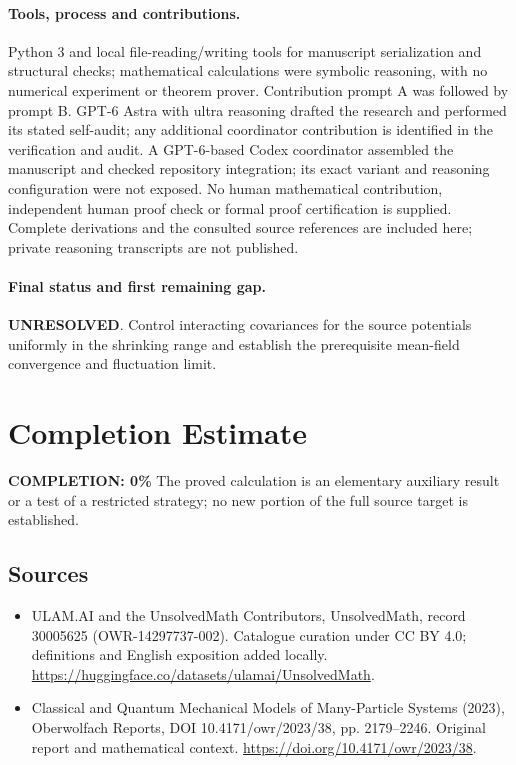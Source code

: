 \documentclass[11pt]{article}
\begin{document}
\paragraph{Tools, process and contributions.}
Python 3 and local file-reading/writing tools for manuscript serialization and structural checks; mathematical calculations were symbolic reasoning, with no numerical experiment or theorem prover. Contribution prompt A was followed by prompt B. GPT-6 Astra with ultra reasoning drafted the research and performed its stated self-audit; any additional coordinator contribution is identified in the verification and audit. A GPT-6-based Codex coordinator assembled the manuscript and checked repository integration; its exact variant and reasoning configuration were not exposed. No human mathematical contribution, independent human proof check or formal proof certification is supplied. Complete derivations and the consulted source references are included here; private reasoning transcripts are not published.

\paragraph{Final status and first remaining gap.}
\textbf{UNRESOLVED}. Control interacting covariances for the source potentials uniformly in the shrinking range and establish the prerequisite mean-field convergence and fluctuation limit.

\section{Completion Estimate}
\noindent\textbf{COMPLETION: 0\%}
The proved calculation is an elementary auxiliary result or a test of a restricted strategy; no new portion of the full source target is established.

\subsection{Sources}
\begin{itemize}
\item[\hypertarget{source:30005625:1}{S1}] ULAM.AI and the UnsolvedMath Contributors, UnsolvedMath, record 30005625 (OWR-14297737-002). Catalogue curation under CC BY 4.0; definitions and English exposition added locally.
\url{https://huggingface.co/datasets/ulamai/UnsolvedMath}.
\item[\hypertarget{source:30005625:2}{S2}] Classical and Quantum Mechanical Models of Many-Particle Systems (2023), Oberwolfach Reports, DOI 10.4171/owr/2023/38, pp. 2179--2246. Original report and mathematical context.
\url{https://doi.org/10.4171/owr/2023/38}.
\end{itemize}
\label{end:30005625}
\end{document}
